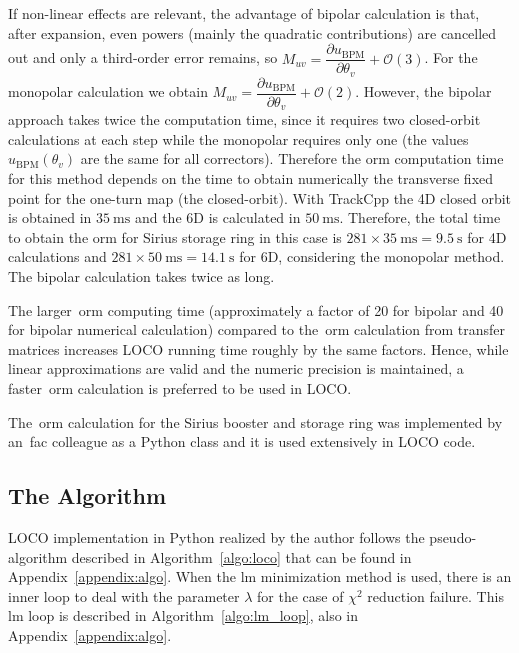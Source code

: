 If non-linear effects are relevant, the advantage of bipolar calculation is that, after expansion, even powers (mainly the quadratic contributions) are cancelled out and only a third-order error remains, so $M_{uv} = \dfrac{\partial u_{\mathrm{BPM}}}{\partial \theta_v} + \mathcal{O}(3)$. For the monopolar calculation we obtain $M_{uv} = \dfrac{\partial u_{\mathrm{BPM}}}{\partial \theta_v} + \mathcal{O}(2)$. However, the bipolar approach takes twice the computation time, since it requires two closed-orbit calculations at each step while the monopolar requires only one (the values $u_{\mathrm{BPM}}\left(\theta_v \right)$ are the same for all correctors). Therefore the \gls{orm} computation time for this method depends on the time to obtain numerically the transverse fixed point for the one-turn map (the closed-orbit). With TrackCpp the 4D closed orbit is obtained in $\SI{35}{\milli\second}$ and the 6D is calculated in $\SI{50}{\milli\second}$. Therefore, the total time to obtain the \gls{orm} for Sirius storage ring in this case is $281 \times \SI{35}{\milli\second} = \SI{9.5}{\second}$ for 4D calculations and $281 \times \SI{50}{\milli\second} = \SI{14.1}{\second}$ for 6D, considering the monopolar method. The bipolar calculation takes twice as long.

The larger~\gls{orm} computing time (approximately a factor of 20 for bipolar and 40 for bipolar numerical calculation) compared to the~\gls{orm} calculation from transfer matrices increases LOCO running time roughly by the same factors. Hence, while linear approximations are valid and the numeric precision is maintained, a faster~\gls{orm} calculation is preferred to be used in LOCO.

The~\gls{orm} calculation for the Sirius booster and storage ring was implemented by an~\gls{fac} colleague as a Python class and it is used extensively in LOCO code.
\subsection{The Algorithm}
LOCO implementation in Python realized by the author follows the pseudo-algorithm described in Algorithm~\ref{algo:loco} that can be found in Appendix~\ref{appendix:algo}. When the \gls{lm} minimization method is used, there is an inner loop to deal with the parameter $\lambda$ for the case of $\chi^2$ reduction failure. This \gls{lm} loop is described in Algorithm~\ref{algo:lm_loop}, also in Appendix~\ref{appendix:algo}.

